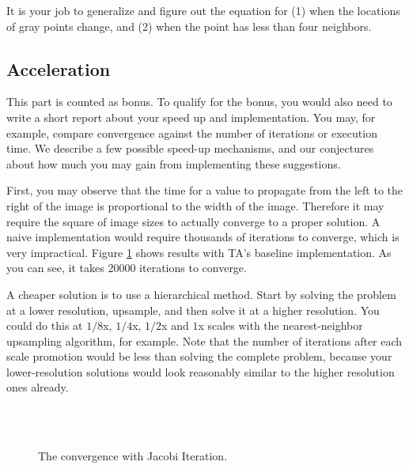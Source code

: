 \documentclass[12pt,a4paper]{article}
\newcommand{\figref}[1]{Figure \ref{fig:#1}}
\begin{document}
It is your job to generalize and figure out the equation for (1) when the locations of gray points change, and (2) when the point has less than four neighbors.

\subsection{Acceleration}

This part is counted as bonus.
To qualify for the bonus, you would also need to write a short report about your speed up and implementation.
You may, for example, compare convergence against the number of iterations or execution time.
We describe a few possible speed-up mechanisms, and our conjectures about how much you may gain from implementing these suggestions.

First, you may observe that
the time for a value to propagate from the left to the right of the image 
is proportional to the width of the image.
Therefore it may require the square of image sizes to actually converge to a proper solution.
A naive implementation would require thousands of iterations to converge,
which is very impractical.
\figref{convergence} shows results with TA's baseline implementation.
As you can see, it takes 20000 iterations to converge.

A cheaper solution is to use a hierarchical method.
Start by solving the problem at a lower resolution, upsample, and then solve it at a higher resolution.
You could do this at $1/8$x, $1/4$x, $1/2$x and $1$x scales with the nearest-neighbor upsampling algorithm, for example.
Note that the number of iterations after each scale promotion would be less than solving the complete problem, because your lower-resolution solutions would look reasonably similar to the higher resolution ones already.

\begin{figure}
\centering
{}
\\
\\
\caption{The convergence with Jacobi Iteration.}\label{fig:convergence}
\end{figure}
\end{document}
